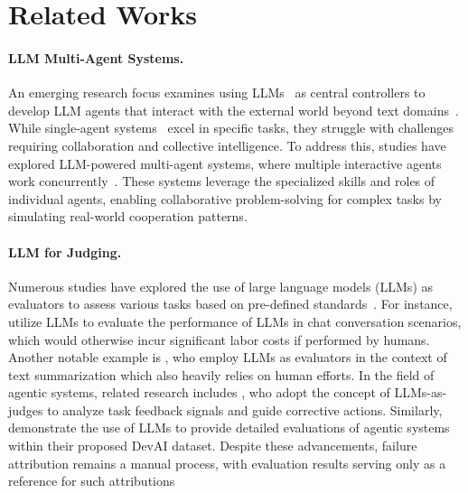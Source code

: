 \section{Related Works}

\paragraph{LLM Multi-Agent Systems.}
An emerging research focus examines using LLMs~\citep{achiam2023gpt, wang2024comprehensive} as central controllers to develop LLM agents that interact with the external world beyond text domains~\citep{xie2024osworld, deng2024mind2web,zhangoffline,zhang2025nemotron}. 
While single-agent systems~\citep{yao2022react,zhang2024ecoact,zhang2023ecoassistant} excel in specific tasks, they struggle with challenges requiring collaboration and collective intelligence. To address this, studies have explored LLM-powered multi-agent systems, where multiple interactive agents work concurrently~\citep{li2023camel,hong2023metagpt}. 
These systems leverage the specialized skills and roles of individual agents, enabling collaborative problem-solving for complex tasks by simulating real-world cooperation patterns.

\paragraph{LLM for Judging.}
Numerous studies have explored the use of large language models (LLMs) as evaluators to assess various tasks based on pre-defined standards~\citep{gu2024survey,fu2023gptscore,liu2023g,thakur2024judging,li2023alpacaeval,hu2024language}. 
For instance, \citet{zheng2023judging,chan2023chateval} utilize LLMs to evaluate the performance of LLMs in chat conversation scenarios, which would otherwise incur significant labor costs if performed by humans. 
Another notable example is \citet{van2024field,miao2023selfcheck}, who employ LLMs as evaluators in the context of text summarization which also heavily relies on human efforts.
In the field of agentic systems, related research includes \citet{shinn2024reflexion}, who adopt the concept of LLMs-as-judges to analyze task feedback signals and guide corrective actions.
Similarly, \citet{zhuge2024agent} demonstrate the use of LLMs to provide detailed evaluations of agentic systems within their proposed DevAI dataset. Despite these advancements, failure attribution remains a manual process, with evaluation results serving only as a reference for such attributions

